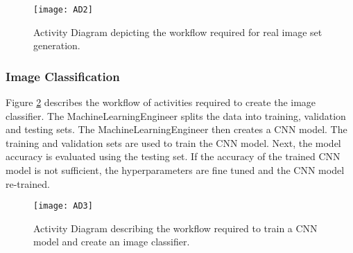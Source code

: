\begin{figure}[H]
\centering
  \texttt{[image: AD2]}
\caption{Activity Diagram depicting the workflow required for real image set generation.}
\label{fig:AD2}
\end{figure}

\subsubsection{Image Classification}
Figure \ref{fig:AD3} describes the workflow of activities required to create the image classifier. The MachineLearningEngineer splits the data into training, validation and testing sets. The MachineLearningEngineer then creates a CNN model. The training and validation sets are used to train the CNN model. Next, the model accuracy is evaluated using the testing set. If the accuracy of the trained CNN model is not sufficient, the hyperparameters are fine tuned and the CNN model re-trained.

\begin{figure}[h]
\centering
  \texttt{[image: AD3]}
\caption{Activity Diagram describing the workflow required to train a CNN model and create an image classifier.}
\label{fig:AD3}
\end{figure}
